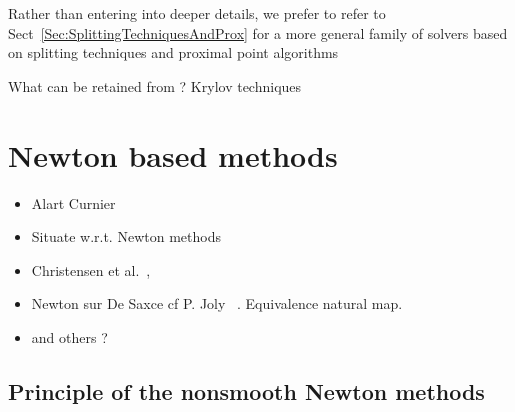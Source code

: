  Rather than entering into deeper details, we prefer to refer to Sect~\ref{Sec:SplittingTechniquesAndProx} for a more general family of solvers based on splitting techniques and proximal point algorithms 


 \begin{ndrva}
   What can be retained from\cite{Heyn_PhD2013} ? Krylov techniques
 \end{ndrva}


\clearpage
\section{Newton based methods}
\label{sec:newtonmethods}

\begin{itemize}
\item Alart Curnier~\cite{Alart.Curnier1991}
\item Situate \cite{Simo.Laursen1992} w.r.t. Newton methods
\item Christensen et al.\cite{Christensen.Klarbring.ea1998}~\cite{Christensen.Pang1998},
\item Newton sur De Saxce cf P. Joly~\cite{Joli.Feng2008} . Equivalence natural map.
\item and others ?~\cite{Stadler_SIOPT2004}~\cite{Hueber.ea_SJSC2008,Hueber.Wolhmuth_CMAME2005}\cite{Koziara.Bicanic_CMAME2008}\cite{Renard_CMAME2013}
\end{itemize}

\subsection{Principle of the nonsmooth Newton methods}

